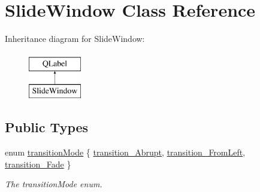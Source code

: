 \hypertarget{classSlideWindow}{}\section{Slide\+Window Class Reference}
\label{classSlideWindow}
Inheritance diagram for Slide\+Window\+:\begin{figure}[H]
\begin{center}
\leavevmode
\includegraphics[height=2.000000cm]{d1/d5b/classSlideWindow}
\end{center}
\end{figure}
\subsection*{Public Types}
\begin{DoxyCompactItemize}
\item 
enum \mbox{\hyperlink{classSlideWindow_aa352c11c452cb40358b09ecb2a98cb1a}{transition\+Mode}} \{ \mbox{\hyperlink{classSlideWindow_aa352c11c452cb40358b09ecb2a98cb1aa61dfbe5a60170195e208af422f94ef1d}{transition\+\_\+\+Abrupt}}, 
\mbox{\hyperlink{classSlideWindow_aa352c11c452cb40358b09ecb2a98cb1aadab6209db6c28cdb19843b2dcc1ad00b}{transition\+\_\+\+From\+Left}}, 
\mbox{\hyperlink{classSlideWindow_aa352c11c452cb40358b09ecb2a98cb1aa8925b9f5baf58543d40799c0c96a3813}{transition\+\_\+\+Fade}}
 \}
\begin{DoxyCompactList}\small\item\em The transition\+Mode enum. \end{DoxyCompactList}\end{DoxyCompactItemize}
